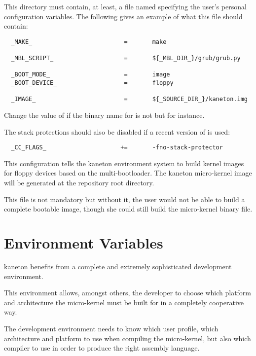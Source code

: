This directory must contain, at least, a file named 
specifying the user's personal configuration variables. The following gives an
example of what this file should contain:

\begin{verbatim}
  _MAKE_                          =       make

  _MBL_SCRIPT_                    =       ${_MBL_DIR_}/grub/grub.py

  _BOOT_MODE_                     =       image
  _BOOT_DEVICE_                   =       floppy

  _IMAGE_                         =       ${_SOURCE_DIR_}/kaneton.img
\end{verbatim}

Change the value of  if the binary name for 
is not  but  for instance.

The stack protections should also be disabled if a recent version of 
is used:

\begin{verbatim}
  _CC_FLAGS_                     +=       -fno-stack-protector
\end{verbatim}

This configuration tells the kaneton environment system to build kernel images
for floppy devices based on the  multi-bootloader. The kaneton
micro-kernel image will be generated at the repository root directory.

This file is not mandatory but without it, the user would not be able to
build a complete bootable image, though she could still build the micro-kernel
binary file.

%
%

\section{Environment Variables}

kaneton benefits from a complete and extremely sophisticated development
environment.

This environment allows, amongst others, the developer to choose which
platform and architecture the micro-kernel must be built for in a completely
cooperative way.

The development environment needs to know which user profile, which
architecture and platform to use when compiling the micro-kernel, but also
which compiler to use in order to produce the right assembly language.

